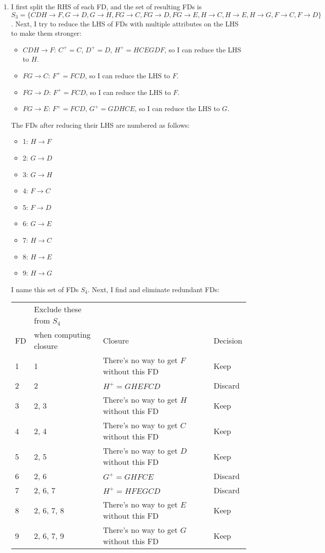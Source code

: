 \documentclass{article}
\begin{document}
\begin{enumerate}
{\item
\begin{enumerate}[itemsep=0.3cm]
\item I first split the RHS of each FD, and the set of resulting FDs is $S_3=\{CDH \to F,G \to D,G \to H,FG \to C,FG \to D,FG \to E,H \to C,H \to E,H \to G,F \to C,F \to D\}$. Next, I try to reduce the LHS of FDs with multiple attributes on the LHS to make them stronger:
\begin{itemize}
    \item $CDH \to F$: $C^+ = C$, $D^+ = D$, $H^+ = HCEGDF$, so I can reduce the LHS to $H$.
    \item $FG \to C$: $F^+ = FCD$, so I can reduce the LHS to $F$.
    \item $FG \to D$: $F^+ = FCD$, so I can reduce the LHS to $F$.
    \item $FG \to E$: $F^+ = FCD$, $G^+ = GDHCE$, so I can reduce the LHS to $G$.
\end{itemize}
The FDs after reducing their LHS are numbered as follows:
\begin{itemize}
    \item 1: $H \to F$
    \item 2: $G \to D$
    \item 3: $G \to H$
    \item 4: $F \to C$
    \item 5: $F \to D$
    \item 6: $G \to E$
    \item 7: $H \to C$
    \item 8: $H \to E$
    \item 9: $H \to G$
\end{itemize}
I name this set of FDs $S_4$. Next, I find and eliminate redundant FDs:\\

\begin{tabular}{l|l|l|l}
& Exclude these from $S_4$ & & \\
FD & when computing closure & Closure & Decision \\
\hline
1 & 1 & There's no way to get $F$ without this FD & Keep \\
2 & 2 & $H^+ = GHEFCD$ & Discard \\
3 & 2, 3 & There's no way to get $H$ without this FD & Keep \\
4 & 2, 4 & There's no way to get $C$ without this FD & Keep \\
5 & 2, 5 & There's no way to get $D$ without this FD & Keep \\
6 & 2, 6 & $G^+ = GHFCE$ & Discard \\
7 & 2, 6, 7 & $H^+ = HFEGCD$ & Discard \\
8 & 2, 6, 7, 8 & There's no way to get $E$ without this FD & Keep \\
9 & 2, 6, 7, 9 & There's no way to get $G$ without this FD & Keep
\end{tabular}\\


\end{enumerate}}
\end{enumerate}
\end{document}
